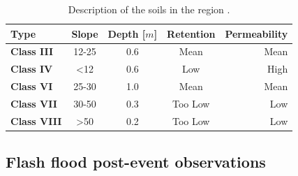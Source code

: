 \documentclass[hess, manuscript]{copernicus}
\begin{document}
\begin{table}[t]
  \caption{Description of the soils in the region \citep{Osorio2008}.}
  \begin{tabular}{lcccr}
  \hline
    \textbf{Type} & \textbf{Slope} & \textbf{Depth [$m$]} & \textbf{Retention} & \textbf{Permeability} \\    
  \hline
    \textbf{Class III} & 12-25 & 0.6 & Mean & Mean \\
    \textbf{Class IV} & <12 & 0.6 & Low & High \\
    \textbf{Class VI} & 25-30 & 1.0 & Mean & Mean \\
    \textbf{Class VII} & 30-50 & 0.3 & Too Low & Low \\
    \textbf{Class VIII} & >50 & 0.2 & Too Low & Low \\
  \hline
  \end{tabular}
  \label{tab:suelos}
\end{table}

\subsection{Flash flood post-event observations}
\end{document}
